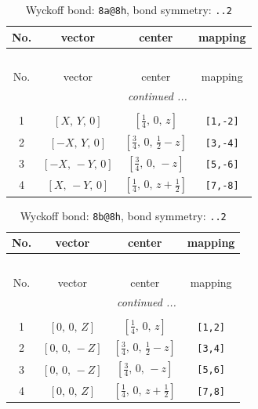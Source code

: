 \documentclass[fleqn,8pt]{jsarticle}
\begin{document}
\begin{longtable}{cccc}
\caption{Wyckoff bond: {\tt 8a@8h}, bond symmetry: {\tt ..2}}
 \\
 \hline \hline
No. & vector & center & mapping \\ \hline \endfirsthead

\multicolumn{3}{l}{\tablename\ \thetable{}} \\
 \hline \hline
No. & vector & center & mapping \\ \hline \endhead

 \hline \hline
\multicolumn{3}{r}{\footnotesize\it continued ...} \\ \endfoot

 \hline \hline
\multicolumn{3}{r}{} \\ \endlastfoot

1 & $\left[ X,\, Y,\, 0 \right]$ & $\left[ \frac{1}{4},\, 0,\, z \right]$ & {\tt [1,-2]} \\ \hline
2 & $\left[ - X,\, Y,\, 0 \right]$ & $\left[ \frac{3}{4},\, 0,\, \frac{1}{2} - z \right]$ & {\tt [3,-4]} \\ \hline
3 & $\left[ - X,\, - Y,\, 0 \right]$ & $\left[ \frac{3}{4},\, 0,\, - z \right]$ & {\tt [5,-6]} \\ \hline
4 & $\left[ X,\, - Y,\, 0 \right]$ & $\left[ \frac{1}{4},\, 0,\, z + \frac{1}{2} \right]$ & {\tt [7,-8]} \\
\end{longtable}
\renewcommand{\arraystretch}{1.2}
\begin{longtable}{cccc}
\caption{Wyckoff bond: {\tt 8b@8h}, bond symmetry: {\tt ..2}}
 \\
 \hline \hline
No. & vector & center & mapping \\ \hline \endfirsthead

\multicolumn{3}{l}{\tablename\ \thetable{}} \\
 \hline \hline
No. & vector & center & mapping \\ \hline \endhead

 \hline \hline
\multicolumn{3}{r}{\footnotesize\it continued ...} \\ \endfoot

 \hline \hline
\multicolumn{3}{r}{} \\ \endlastfoot

1 & $\left[ 0,\, 0,\, Z \right]$ & $\left[ \frac{1}{4},\, 0,\, z \right]$ & {\tt [1,2]} \\ \hline
2 & $\left[ 0,\, 0,\, - Z \right]$ & $\left[ \frac{3}{4},\, 0,\, \frac{1}{2} - z \right]$ & {\tt [3,4]} \\ \hline
3 & $\left[ 0,\, 0,\, - Z \right]$ & $\left[ \frac{3}{4},\, 0,\, - z \right]$ & {\tt [5,6]} \\ \hline
4 & $\left[ 0,\, 0,\, Z \right]$ & $\left[ \frac{1}{4},\, 0,\, z + \frac{1}{2} \right]$ & {\tt [7,8]} \\
\end{longtable}
\end{document}
